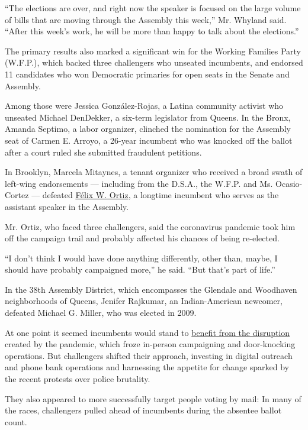 ``The elections are over, and right now the speaker is focused on the
large volume of bills that are moving through the Assembly this week,''
Mr. Whyland said. ``After this week's work, he will be more than happy
to talk about the elections.''

The primary results also marked a significant win for the Working
Families Party (W.F.P.), which backed three challengers who unseated
incumbents, and endorsed 11 candidates who won Democratic primaries for
open seats in the Senate and Assembly.

Among those were Jessica González-Rojas, a Latina community activist who
unseated Michael DenDekker, a six-term legislator from Queens. In the
Bronx, Amanda Septimo, a labor organizer, clinched the nomination for
the Assembly seat of Carmen E. Arroyo, a 26-year incumbent who was
knocked off the ballot after a court ruled she submitted fraudulent
petitions.

In Brooklyn, Marcela Mitaynes, a tenant organizer who received a broad
swath of left-wing endorsements --- including from the D.S.A., the
W.F.P. and Ms. Ocasio-Cortez --- defeated
\href{https://nyassembly.gov/mem/Felix-W-Ortiz}{Félix W. Ortiz}, a
longtime incumbent who serves as the assistant speaker in the Assembly.

Mr. Ortiz, who faced three challengers, said the coronavirus pandemic
took him off the campaign trail and probably affected his chances of
being re-elected.

``I don't think I would have done anything differently, other than,
maybe, I should have probably campaigned more,'' he said. ``But that's
part of life.''

In the 38th Assembly District, which encompasses the Glendale and
Woodhaven neighborhoods of Queens, Jenifer Rajkumar, an Indian-American
newcomer, defeated Michael G. Miller, who was elected in 2009.

At one point it seemed incumbents would stand to
\href{https://www.nytimes3xbfgragh.onion/2020/06/18/nyregion/ny-progressives-elections-coronavirus.html}{benefit
from the disruption} created by the pandemic, which froze in-person
campaigning and door-knocking operations. But challengers shifted their
approach, investing in digital outreach and phone bank operations and
harnessing the appetite for change sparked by the recent protests over
police brutality.

They also appeared to more successfully target people voting by mail: In
many of the races, challengers pulled ahead of incumbents during the
absentee ballot count.

